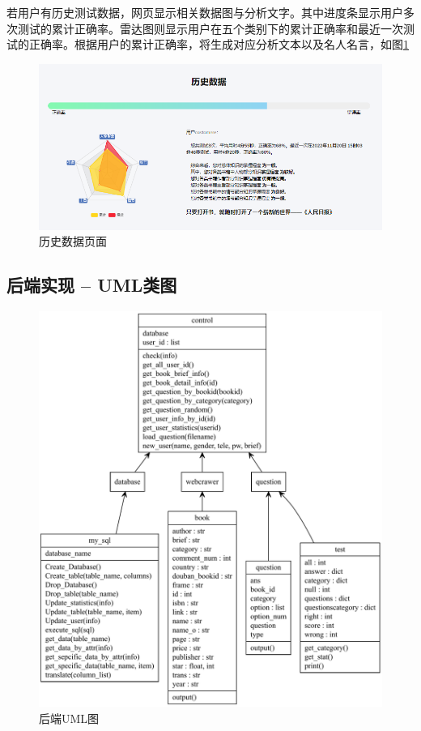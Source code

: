 \documentclass[twoside,11pt]{article}
\begin{document}
若用户有历史测试数据，网页显示相关数据图与分析文字。其中进度条显示用户多次测试的累计正确率。雷达图则显示用户在五个类别下的累计正确率和最近一次测试的正确率。根据用户的累计正确率，将生成对应分析文本以及名人名言，如图\ref{fig:stat}

\begin{figure}[H]
    \centering
    \includegraphics[width=1\columnwidth]{figures/stat.png}
    \caption{历史数据页面}\label{fig:stat}
\end{figure}

\newpage
\subsection{后端实现 -- UML类图}
\begin{figure}[htbp]
    \includegraphics[width=1\columnwidth]{figures/backenduml.pdf}
    \caption{后端UML图}
    \label{fig:backenduml}
\end{figure}
\end{document}
